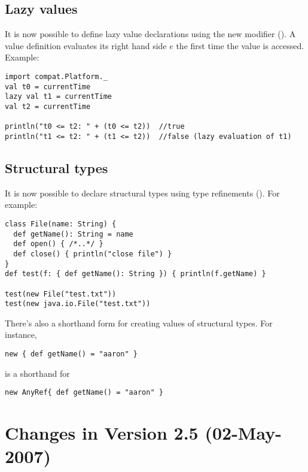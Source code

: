 \subsection*{Lazy values}

It is now possible to define lazy value declarations
using the new modifier \lstinline@lazy@ ().
A \lstinline@lazy@ value definition evaluates
its right hand side $e$ the first time the value is accessed.
Example:
\begin{lstlisting}
import compat.Platform._
val t0 = currentTime
lazy val t1 = currentTime
val t2 = currentTime

println("t0 <= t2: " + (t0 <= t2))  //true
println("t1 <= t2: " + (t1 <= t2))  //false (lazy evaluation of t1)
\end{lstlisting}

\subsection*{Structural types}

It is now possible to declare structural types using type
refinements (). For example:
\begin{lstlisting}
class File(name: String) {
  def getName(): String = name
  def open() { /*..*/ }
  def close() { println("close file") }
}
def test(f: { def getName(): String }) { println(f.getName) }

test(new File("test.txt"))
test(new java.io.File("test.txt"))
\end{lstlisting}

There's also a shorthand form for creating values of structural
types. For instance,
\begin{lstlisting}
new { def getName() = "aaron" }
\end{lstlisting}
is a shorthand for 
\begin{lstlisting}
new AnyRef{ def getName() = "aaron" }
\end{lstlisting}

\section*{Changes in Version 2.5 (02-May-2007)}

